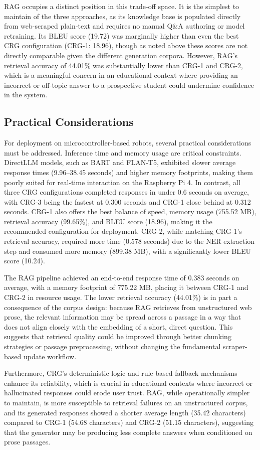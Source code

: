 \documentclass[conference]{IEEEtran}
\begin{document}
RAG occupies a distinct position in this trade-off space.
It is the simplest to maintain of the three approaches, as its knowledge base is populated directly from web-scraped plain-text and requires no manual Q\&A authoring or model retraining.
Its BLEU score (19.72) was marginally higher than even the best CRG configuration (CRG-1: 18.96), though as noted above these scores are not directly comparable given the different generation corpora.
However, RAG's retrieval accuracy of 44.01\% was substantially lower than CRG-1 and CRG-2, which is a meaningful concern in an educational context where providing an incorrect or off-topic answer to a prospective student could undermine confidence in the system.

\subsection{Practical Considerations}
For deployment on microcontroller-based robots, several practical considerations must be addressed. 
Inference time and memory usage are critical constraints. 
DirectLLM models, such as BART and FLAN-T5, exhibited slower average response times (9.96--38.45 seconds) and higher memory footprints, making them poorly suited for real-time interaction on the Raspberry Pi 4.
In contrast, all three CRG configurations completed responses in under 0.6 seconds on average, with CRG-3 being the fastest at 0.300 seconds and CRG-1 close behind at 0.312 seconds.
CRG-1 also offers the best balance of speed, memory usage (755.52 MB), retrieval accuracy (99.65\%), and BLEU score (18.96), making it the recommended configuration for deployment.
CRG-2, while matching CRG-1's retrieval accuracy, required more time (0.578 seconds) due to the NER extraction step and consumed more memory (899.38 MB), with a significantly lower BLEU score (10.24).

The RAG pipeline achieved an end-to-end response time of 0.383 seconds on average, with a memory footprint of 775.22 MB, placing it between CRG-1 and CRG-2 in resource usage.
The lower retrieval accuracy (44.01\%) is in part a consequence of the corpus design: because RAG retrieves from unstructured web prose, the relevant information may be spread across a passage in a way that does not align closely with the embedding of a short, direct question.
This suggests that retrieval quality could be improved through better chunking strategies or passage preprocessing, without changing the fundamental scraper-based update workflow.

Furthermore, CRG's deterministic logic and rule-based fallback mechanisms enhance its reliability, which is crucial in educational contexts where incorrect or hallucinated responses could erode user trust.
RAG, while operationally simpler to maintain, is more susceptible to retrieval failures on an unstructured corpus, and its generated responses showed a shorter average length (35.42 characters) compared to CRG-1 (54.68 characters) and CRG-2 (51.15 characters), suggesting that the generator may be producing less complete answers when conditioned on prose passages.
\end{document}

